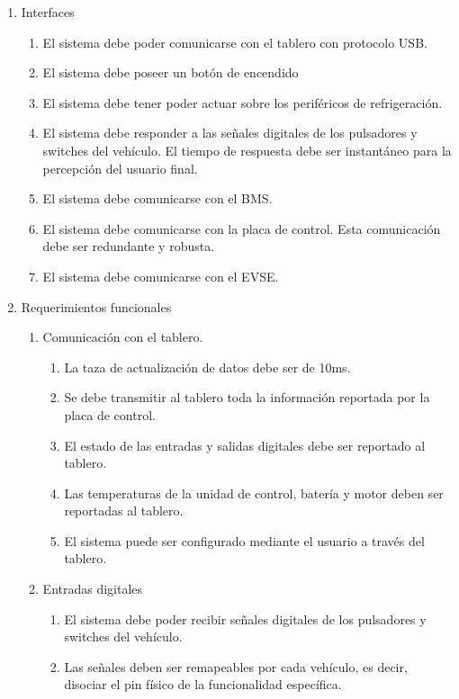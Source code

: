 \documentclass[
11pt, %
codirector, %
]{charter}
\begin{document}
\begin{enumerate}
	\item Interfaces
	      \begin{enumerate}
		      \item El sistema debe poder comunicarse con el tablero con protocolo USB.
		      \item El sistema debe poseer un botón de encendido
		      \item El sistema debe tener poder actuar sobre los periféricos de refrigeración.
		      \item El sistema debe responder a las señales digitales de los pulsadores y switches del vehículo. El tiempo de respuesta debe ser instantáneo para la percepción del usuario final.
		      \item El sistema debe comunicarse con el BMS.
		      \item El sistema debe comunicarse con la placa de control. Esta comunicación debe ser redundante y robusta.
		      \item El sistema debe comunicarse con el EVSE.
	      \end{enumerate}
	\item Requerimientos funcionales
	      \begin{enumerate}
		      \item Comunicación con el tablero.
		            \begin{enumerate}
			            \item La taza de actualización de datos debe ser de 10ms.
			            \item Se debe transmitir al tablero toda la información reportada por la placa de control.
			            \item El estado de las entradas y salidas digitales debe ser reportado al tablero.
			            \item Las temperaturas de la unidad de control, batería y motor deben ser reportadas al tablero.
			            \item El sistema puede ser configurado mediante el usuario a través del tablero.
		            \end{enumerate}
		      \item Entradas digitales
		            \begin{enumerate}
			            \item El sistema debe poder recibir señales digitales de los pulsadores y switches del vehículo.
			            \item Las señales deben ser remapeables por cada vehículo, es decir, disociar el pin físico de la funcionalidad específica.

\end{enumerate}
\end{enumerate}
\end{enumerate}
\end{document}
